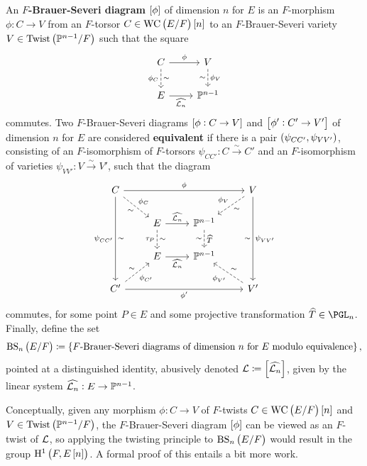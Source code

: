 \begin{definition}
An \textbf{$ F $-Brauer-Severi diagram} $ \sbr{\phi} $ of dimension $ n $ for $ E $ is an $ F $-morphism $ \phi : C \to V $ from an $ F $-torsor $ C \in \WC{F}\sbr{n} $ to an $ F $-Brauer-Severi variety $ V \in \Twist{\PP^{n - 1}}{F} $ such that the square
$$
\begin{tikzcd}
C \arrow{r}{\phi} \arrow[dashed]{d}{\sim}[swap]{\phi_C} & V \arrow[dashed]{d}{\phi_V}[swap]{\sim} \\
E \arrow{r}[swap]{\widehat{\LLL_n}} & \PP^{n - 1}
\end{tikzcd}
$$
commutes. Two $ F $-Brauer-Severi diagrams $ \sbr{\phi : C \to V} $ and $ \sbr{\phi' : C' \to V'} $ of dimension $ n $ for $ E $ are considered \textbf{equivalent} if there is a pair $ \br{\psi_{CC'}, \psi_{VV'}} $, consisting of an $ F $-isomorphism of $ F $-torsors $ \psi_{CC'} : C \xrightarrow{\sim} C' $ and an $ F $-isomorphism of varieties $ \psi_{VV'} : V \xrightarrow{\sim} V' $, such that the diagram
$$
\begin{tikzcd}
C \arrow{rrr}{\phi} \arrow[dashed]{dr}{\phi_C}[swap]{\sim} \arrow{ddd}{\sim}[swap]{\psi_{CC'}} & & & V \arrow[dashed]{dl}{\sim}[swap]{\phi_V} \arrow{ddd}{\psi_{VV'}}[swap]{\sim} \\
& E \arrow{r}{\widehat{\LLL_n}} \arrow[dashed]{d}{\sim}[swap]{\tau_P} & \PP^{n - 1} \arrow[dashed]{d}{\widehat{T}}[swap]{\sim} & \\
& E \arrow{r}[swap]{\widehat{\LLL_n}} & \PP^{n - 1} & \\
C' \arrow[dashed]{ur}{\sim}[swap]{\phi_{C'}} \arrow{rrr}[swap]{\phi'} & & & V' \arrow[dashed]{ul}{\phi_{V'}}[swap]{\sim}
\end{tikzcd}
$$
commutes, for some point $ P \in E $ and some projective transformation $ \widehat{T} \in \PGL_n $. Finally, define the set
$$ \BS{F} \coloneqq \cbr{\text{$ F $-Brauer-Severi diagrams of dimension} \ n \ \text{for} \ E \ \text{modulo equivalence}}, $$
pointed at a distinguished identity, abusively denoted $ \LLL \coloneqq \sbr{\widehat{\LLL_n}} $, given by the linear system $ \widehat{\mathcal{L}_n} : E \to \mathbb{P}^{n - 1} $.
\end{definition}

Conceptually, given any morphism $ \phi : C \to V $ of $ F $-twists $ C \in \WC{F}\sbr{n} $ and $ V \in \Twist{\PP^{n - 1}}{F} $, the $ F $-Brauer-Severi diagram $ \sbr{\phi} $ can be viewed as an $ F $-twist of $ \mathcal{L} $, so applying the twisting principle to $ \BS{F} $ would result in the group $ \HE[n]{F} $. A formal proof of this entails a bit more work.

